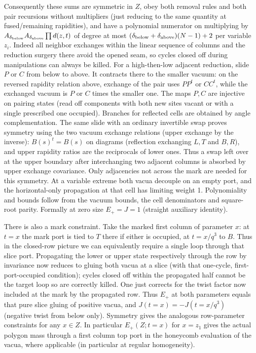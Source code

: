 \documentclass[11pt]{article}
\numberwithin{equation}{section}
\theoremstyle{definition}\newtheorem{definition}[theorem]{Definition}
\theoremstyle{remark}\newtheorem{remark}[theorem]{Remark}
\begin{document}
Consequently these sums are symmetric in \(Z\), obey both removal rules and both pair recursions without multipliers (just reducing to the same quantity at fused/remaining rapidities), and have a polynomial numerator on multiplying by \(A_{\delta_{\rm below}} A_{\delta_{\rm above}}\prod d(z,t)\) of degree at most \((\delta_{\rm below}+\delta_{\rm above})(N-1)+2\) per variable \(z_i\). Indeed all neighbor exchanges within the linear sequence of columns and the reduction surgery there avoid the opened seam, so cycles closed off during manipulations can always be killed. For a high-then-low adjacent reduction, slide \(P\) or \(C\) from below to above. It contracts there to the smaller vacuum: on the reversed rapidity relation above, exchange of the pair uses \(PP^t\) or \(CC^t\), while the exchanged vacuum is \(P\) or \(C\) times the smaller one. The maps \(P,C\) are injective on pairing states (read off components with both new sites vacant or with a single prescribed one occupied). Branches for reflected cells are obtained by angle complementation. The same slide with an ordinary invertible swap proves symmetry using the two vacuum exchange relations (upper exchange by the inverse): \(B(s)^t=B(s)\) on diagrams (reflection exchanging \(L,T\) and \(B,R\)), and upper rapidity ratios are the reciprocals of lower ones. Thus a swap left over at the upper boundary after interchanging two adjacent columns is absorbed by upper exchange covariance. Only adjacencies not across the mark are needed for this symmetry. At a variable extreme both vacua decouple on an empty port, and the horizontal-only propagation at that cell has limiting weight 1. Polynomiality and bounds follow from the vacuum bounds, the cell denominators and square-root parity. Formally at zero size \(E_+=J=1\) (straight auxiliary identity).

There is also a mark constraint. Take the marked first column of parameter \(x\): at \(t=x\) the mark port is tied to \(T\) there if either is occupied, at \(t=x/q^3\) to \(B\). Thus in the closed-row picture we can equivalently require a single loop through that slice port. Propagating the lower or upper state respectively through the row by invariance now reduces to gluing both vacua at a slice (with that one-cycle, first-port-occupied condition); cycles closed off within the propagated half cannot be the target loop so are correctly killed. One just corrects for the twist factor now included at the mark by the propagated row. Thus \(E_+\) at both parameters equals that pure slice gluing of positive vacua, and \(J(t=x)=-J(t=x/q^3)\) (negative twist from below only). Symmetry gives the analogous row-parameter constraints for any \(x\in Z\). In particular \(E_+(Z;t=x)\) for \(x=z_1\) gives the actual polygon mass through a first column top port in the honeycomb evaluation of the vacua, where applicable (in particular at regular homogeneity).
\end{document}
